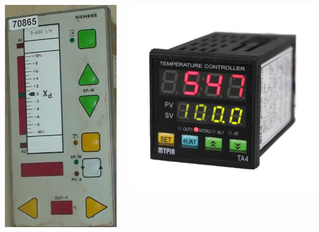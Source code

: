 \begin{frame}
\begin{columns}
\begin{column}{0.5\linewidth}
\begin{columns}
\begin{column}{0.4\linewidth}
					\includegraphics[height=0.7\textheight]{img/278}

				\end{column}
				\begin{column}{0.6\linewidth}
					\includegraphics[height=0.4\textheight]{img/41LH64+SGWL}

				\end{column}
			\end{columns}
		\end{column}
	\end{columns}
\end{frame}

